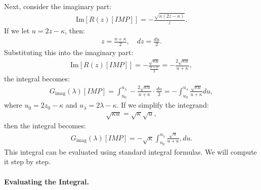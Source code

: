 Next, consider the imaginary part:
\begin{align}
\text{Im}[R(z)[IMP]] = - \frac{ \sqrt{ \kappa(2z - \kappa) } }{ z }.
\end{align}
%
If we let $u = 2z - \kappa$, then:
\begin{align}
z = \frac{u + \kappa}{2}, \quad dz = \frac{du}{2}.
\end{align}
%
Substituting this into the imaginary part:
\begin{align}
\text{Im}[R(z)[IMP]] = - \frac{ \sqrt{ \kappa u } }{ \frac{u + \kappa}{2} } = - \frac{ 2 \sqrt{ \kappa u } }{ u + \kappa } ,
\end{align}
the integral becomes:
\begin{align}
G_{\text{imag}}(\lambda)[IMP] 
   = \int_{u_0}^{u_\lambda} - \frac{ 2 \sqrt{ \kappa u } }{ u + \kappa } \cdot \frac{du}{2}  
   = - \int_{u_0}^{u_\lambda} \frac{ \sqrt{ \kappa u } }{ u + \kappa } du  ,
\end{align}
where $u_0 = 2 z_0 - \kappa$ and $u_\lambda = 2 \lambda - \kappa$.
%
If we simplify the integrand:
\begin{align}
\sqrt{ \kappa u } = \sqrt{ \kappa } \sqrt{ u }, 
\end{align}
%
then the integral becomes:
\begin{align}
G_{\text{imag}}(\lambda)[IMP] = - \sqrt{ \kappa } \int_{u_0}^{u_\lambda} \frac{ \sqrt{ u } }{ u + \kappa } , du.
\end{align}
%
This integral can be evaluated using standard integral formulas. 
We will compute it step by step.


\paragraph{Evaluating the Integral.}

